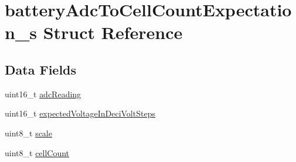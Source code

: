 \hypertarget{structbatteryAdcToCellCountExpectation__s}{\section{battery\+Adc\+To\+Cell\+Count\+Expectation\+\_\+s Struct Reference}
\label{structbatteryAdcToCellCountExpectation__s}
}
\subsection*{Data Fields}
\begin{DoxyCompactItemize}
\item 
uint16\+\_\+t \hyperlink{structbatteryAdcToCellCountExpectation__s_ab371a85d3f71841b32bb823e1d58db7b}{adc\+Reading}
\item 
uint16\+\_\+t \hyperlink{structbatteryAdcToCellCountExpectation__s_a6a02f47fab554c33d21f5d1cfdae4c86}{expected\+Voltage\+In\+Deci\+Volt\+Steps}
\item 
uint8\+\_\+t \hyperlink{structbatteryAdcToCellCountExpectation__s_ae165a3c541c04eeb850c0794b2516953}{scale}
\item 
uint8\+\_\+t \hyperlink{structbatteryAdcToCellCountExpectation__s_a98ce37c10645eb1e39b95699415130ce}{cell\+Count}
\end{DoxyCompactItemize}



